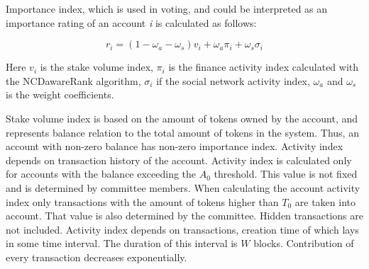 \documentclass[a4paper,12pt]{article}
\begin{document}
Importance index, which is used in voting, and could be interpreted as an importance rating of an account \textit{i} is calculated as follows: 

$$
r_i = (1 - \omega_a - \omega_s) v_i + \omega_a \pi_i + \omega_s \sigma_i
$$

Here $v_i$ is the stake volume index, $\pi_i$ is the finance activity index calculated with the NCDawareRank algorithm, $\sigma_i$ if the social network activity index, $\omega_a$ and $\omega_s$ is the weight coefficients. 


Stake volume index is based on the amount of tokens owned by the account, and represents balance relation to the total amount of tokens in the system. Thus, an account with non-zero balance has non-zero importance index. Activity index depends on transaction history of the account. Activity index is calculated only for accounts with the balance exceeding the $A_0$ threshold. This value is not fixed and is determined by committee members. When calculating the account activity index only transactions with the amount of tokens higher than $T_0$ are taken into account. That value is also determined by the committee. Hidden transactions are not included. Activity index depends on transactions, creation time of which lays in some time interval. The duration of this interval is $W$ blocks. Contribution of every transaction decreases exponentially.

\end{document}
